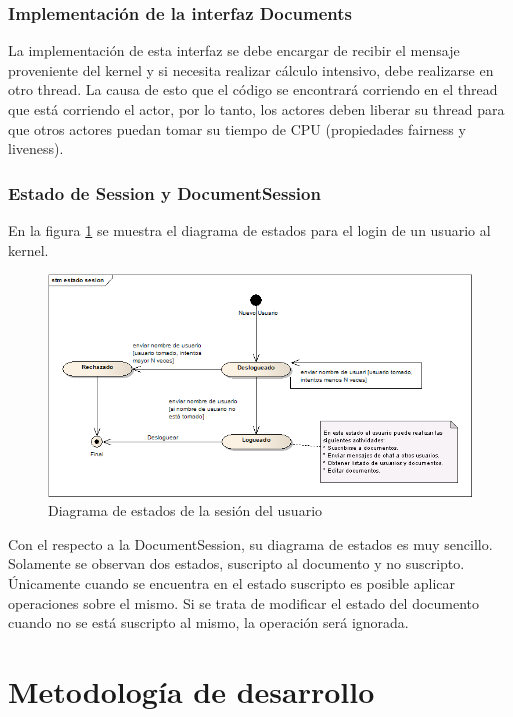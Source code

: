\documentclass[12pt,a4paper]{article}
\begin{document}
\subsubsection{Implementación de la interfaz Documents}
La implementación de esta interfaz se debe encargar de recibir el mensaje proveniente del kernel y si necesita realizar
cálculo intensivo, debe realizarse en otro thread. La causa de esto que el código se encontrará corriendo en el thread que
está corriendo el actor, por lo tanto, los actores deben liberar su thread para que otros actores puedan tomar su tiempo de CPU
(propiedades fairness y liveness).

\subsubsection{Estado de Session y DocumentSession}

En la figura \ref{estado-sesion} se muestra el diagrama de estados para el login de un usuario al kernel.

	\begin{figure}[!ht]
		\begin{center}
			\includegraphics[width=14cm]{estado-sesion.png}
			\caption{\label{estado-sesion} Diagrama de estados de la sesión del usuario }
		\end{center}
	\end{figure}

Con el respecto a la DocumentSession, su diagrama de estados es muy sencillo. Solamente se observan dos estados, suscripto al
documento y no suscripto. Únicamente cuando se encuentra en el estado suscripto es posible aplicar operaciones sobre el mismo.
Si se trata de modificar el estado del documento cuando no se está suscripto al mismo, la operación será ignorada.

\section{Metodología de desarrollo}
\end{document}

